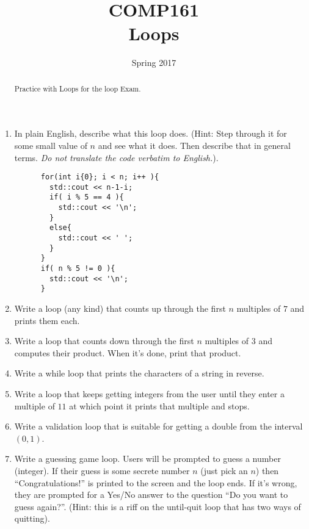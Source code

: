 \documentclass[nobib]{tufte-handout}
\title{COMP161 \\ Loops}
\author{}
\date{Spring 2017}
\begin{document}
\maketitle

\begin{abstract}
  Practice with Loops for the loop Exam.
\end{abstract}

\begin{enumerate}
  \item In plain English, describe what this loop does. (Hint: Step through it for some small value of $n$ and see what it does. Then describe that in general terms. \textit{Do not translate the code verbatim to English.}).

    \begin{lstlisting}
      for(int i{0}; i < n; i++ ){
        std::cout << n-1-i;
        if( i % 5 == 4 ){
          std::cout << '\n';
        }
        else{
          std::cout << ' ';
        }
      }
      if( n % 5 != 0 ){
        std::cout << '\n';
      }
    \end{lstlisting}

  \item Write a loop (any kind) that counts up through the first $n$ multiples of $7$ and prints them each.

  \item Write a loop that counts down through the first $n$ multiples of $3$ and computes their product. When it's done, print that product.

  \item Write a while loop that prints the characters of a string in reverse.

  \item Write a loop that keeps getting integers from the user until they enter a multiple of $11$ at which point it prints that multiple and stops.

  \item Write a validation loop that is suitable for getting a double from the interval $(0,1)$.

  \item Write a guessing game loop. Users will be prompted to guess a number (integer). If their guess is some secrete number $n$ (just pick an $n$) then ``Congratulations!'' is printed to the screen and the loop ends. If it's wrong, they are prompted for a Yes/No answer to the question ``Do you want to guess again?''. (Hint: this is a riff on the until-quit loop that has two ways of quitting).

\end{enumerate}
\end{document}
